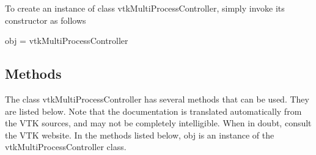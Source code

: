 To create an instance of class vtk\-Multi\-Process\-Controller, simply invoke its constructor as follows \begin{DoxyVerb}  obj = vtkMultiProcessController
\end{DoxyVerb}
 \hypertarget{vtkwidgets_vtkxyplotwidget_Methods}{}\subsection{Methods}\label{vtkwidgets_vtkxyplotwidget_Methods}
The class vtk\-Multi\-Process\-Controller has several methods that can be used. They are listed below. Note that the documentation is translated automatically from the V\-T\-K sources, and may not be completely intelligible. When in doubt, consult the V\-T\-K website. In the methods listed below, {\ttfamily obj} is an instance of the vtk\-Multi\-Process\-Controller class. 
